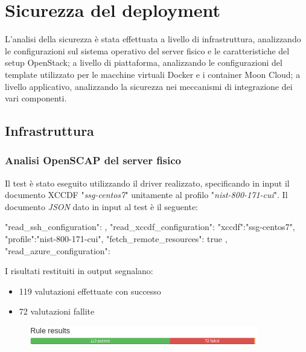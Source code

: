 \documentclass[../main.tex]{subfiles}
\begin{document}
\section{Sicurezza del deployment}
L'analisi della sicurezza è stata effettuata a livello di infrastruttura, analizzando le configurazioni sul sistema operativo del server fisico e le caratteristiche del setup OpenStack; a livello di piattaforma, analizzando le configurazioni del template utilizzato per le macchine virtuali Docker e i container Moon Cloud; a livello applicativo, analizzando la sicurezza nei meccanismi di integrazione dei vari componenti.
\subsection{Infrastruttura}
\subsubsection{Analisi OpenSCAP del server fisico}

Il test è stato eseguito utilizzando il driver realizzato, specificando in input il documento XCCDF "\textit{ssg-centos7}" unitamente al profilo "\textit{nist-800-171-cui}".
Il documento \textit{JSON} dato in input al test è il seguente:
\begin{js}
{
    "read_ssh_configuration": {
    },
    "read_xccdf_configuration": {
        "xccdf":"ssg-centos7",
        "profile":"nist-800-171-cui",
        "fetch_remote_resources": true
    },
    "read_azure_configuration": {
    }
}
\end{js}

I risultati restituiti in output segnalano:
\begin{itemize}
    \item 119 valutazioni effettuate con successo
    \item 72 valutazioni fallite
\end{itemize}
\begin{figure}[H]
    \centering
    \includegraphics[width=10cm]{immagini/test_oscap_1.png}
\end{figure}
\end{document}
